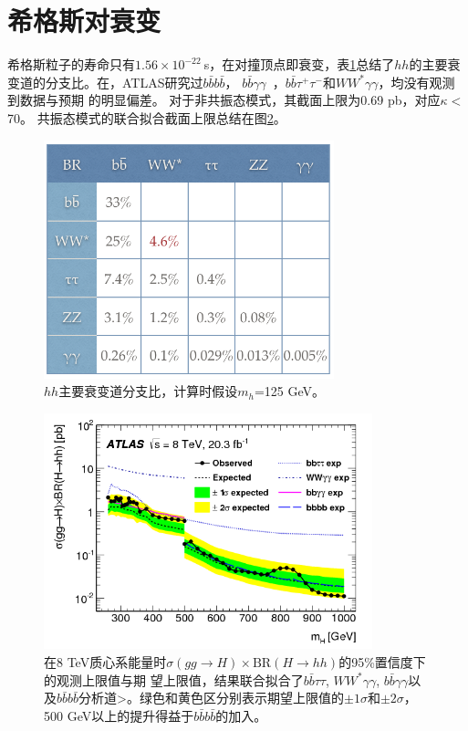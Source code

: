 \section{希格斯对衰变}
希格斯粒子的寿命只有$1.56\times10^{-22}~$s，在对撞顶点即衰变，表\ref{fig:HH_br}总结了$hh$的主要衰变道的分支比。在\RunOne ，ATLAS研究过$b\bar{b}b\bar{b}$\cite{Aad:2015uka}，
$b\bar{b}\gamma\gamma$~\cite{Aad:2014yja}，$b\bar{b}\tau^{+}\tau^{-}$和$WW^{*}\gamma\gamma$，均没有观测到数据与预期
的明显偏差。
对于非共振态模式，其截面上限为0.69 pb，对应$\kappa<$70。
共振态模式的联合拟合截面上限总结在图\ref{fig:HH_run1_combined}。
\begin{figure}[h]
\centering
 \includegraphics[width=0.75\textwidth]{fig/HH_br.png}
  \caption{$hh$主要衰变道分支比，计算时假设$m_h$=125 GeV。}
  \label{fig:HH_br}
\end{figure}

\begin{figure}[h]
\centering
 \includegraphics[width=0.85\textwidth]{fig/HH_run1_combined.png}
\caption{在8 TeV质心系能量时$\sigma(gg\rightarrow H)\times\text{BR}(H\rightarrow hh)$的95\%置信度下的观测上限值与期
望上限值，结果联合拟合了$b\bar{b}\tau\tau$, $WW^*\gamma\gamma$, $b\bar{b}\gamma\gamma$以及$b\bar{b}b\bar{b}$分析道>。绿色和黄色区分别表示期望上限值的$\pm 1\sigma$和$\pm 2\sigma$，500 GeV以上的提升得益于$b\bar{b}b\bar{b}$的加入。}
\label{fig:HH_run1_combined}
\end{figure}

